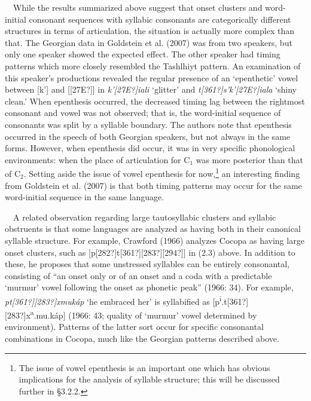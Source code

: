 \documentclass[12pt]{article}
\newcommand\textsubscript[1]{\ensuremath{{}_{\text{#1}}}}
\newenvironment{styleBody}{\renewcommand\baselinestretch{1.0}\setlength\leftskip{0in}\setlength\rightskip{0in plus 1fil}\setlength\parindent{0in}\setlength\parfillskip{0pt plus 1fil}\setlength\parskip{0in plus 1pt}\writerlistparindent\writerlistleftskip\leavevmode\normalfont\normalsize\fontsize{11pt}{13.2pt}\selectfont\mdseries\upshape\writerlistlabel\ignorespaces}{\unskip\vspace{0in plus 1pt}\par}
\newcommand\writerlistleftskip{}
\newcommand\writerlistparindent{}
\newcommand\writerlistlabel{}
\begin{document}
\begin{styleBody}
\ \ While the results summarized above suggest that onset clusters and word-initial consonant sequences with syllabic consonants are categorically different structures in terms of articulation, the situation is actually more complex than that. The Georgian data in Goldstein et al. (2007) was from two speakers, but only one speaker showed the expected effect. The other speaker had timing patterns which more closely resembled the Tashlhiyt pattern. An examination of this speaker’s productions revealed the regular presence of an ‘epenthetic’ vowel between [k’] and [[27E?]] in \textit{k'[27E?]iali} ‘glitter’ and \textit{t[361?]s’k’[27E?]iala} ‘shiny clean.’ When epenthesis occurred, the decreased timing lag between the rightmost consonant and vowel was not observed; that is, the word-initial sequence of consonants was split by a syllable boundary. The authors note that epenthesis occurred in the speech of both Georgian speakers, but not always in the same forms. However, when epenthesis did occur, it was in very specific phonological environments: when the place of articulation for C\textsubscript{1} was more posterior than that of C\textsubscript{2}. Setting aside the issue of vowel epenthesis for now,\footnote{\textrm{The issue of vowel epenthesis is an important one which has obvious implications for the analysis of syllable structure; this will be discussed further in §3.2.2.}} an interesting finding from Goldstein et al. (2007) is that both timing patterns may occur for the same word-initial sequence in the same language.
\end{styleBody}

\begin{styleBody}
\ \ A related observation regarding large tautosyllabic clusters and syllabic obstruents is that some languages are analyzed as having both in their canonical syllable structure. For example, Crawford (1966) analyzes Cocopa as having large onset clusters, such as [p[282?]t[361?][283?][294?]] in (2.3) above. In addition to these, he proposes that some unstressed syllables can be entirely consonantal, consisting of “an onset only or of an onset and a coda with a predictable ‘murmur’ vowel following the onset as phonetic peak” (1966: 34). For example, \textit{pt[361?][283?]xmuk\'{a}p }‘he embraced her’ is syllabified as [p\textsuperscript{i}.t[361?][283?]x\textsuperscript{a}.mu.k\'{a}p] (1966: 43; quality of ‘murmur’ vowel determined by environment). Patterns of the latter sort occur for specific consonantal combinations in Cocopa, much like the Georgian patterns described above. 
\end{styleBody}
\end{document}
